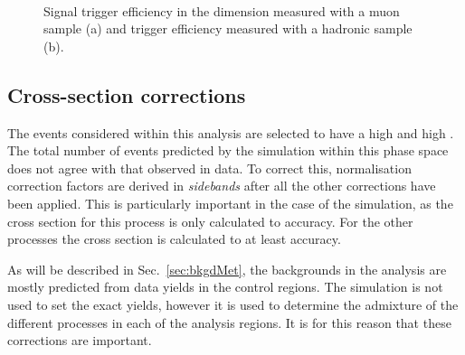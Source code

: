 \begin{figure}[h!]
  \begin{center}
     ~~\
     \\ 
    \caption{Signal trigger efficiency in the \mht dimension measured
    with a muon sample (a) and \gj trigger efficiency measured with a
    hadronic sample (b).}
    \label{fig:trigEffsAt}
  \end{center}
\end{figure}

\subsection{Cross-section corrections}

The events considered within this analysis are selected
to have a high \HT and high \MET. The total number of events predicted
by the \MC simulation within this phase space does not agree with that
observed in data. To correct this, normalisation correction factors are
derived in \emph{sidebands} after all the other corrections have been
applied. This is particularly important in the case of the \gj simulation,
as the cross section for this process is only calculated to \LO
accuracy. For the other processes the cross section is calculated to
at least \NLO accuracy. 

As will be described in Sec.~\ref{sec:bkgdMet}, the backgrounds in the
analysis are mostly predicted from data yields in the control regions.
The simulation is not used to set the exact yields, however it is used
to determine the admixture of the different processes in each of the
analysis regions.  It is for this reason that these corrections are
important.

